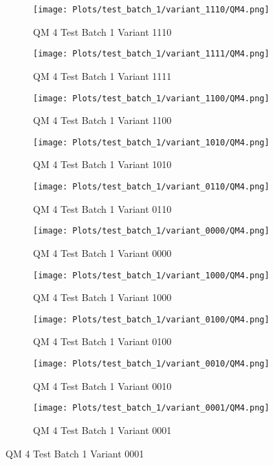 \documentclass{DissertateFigs}
\begin{document}
\begin{figure}[t!]
    \begin{subfigure}{0.47\textwidth}
    \texttt{[image: Plots/test\_batch\_1/variant\_1110/QM4.png]}
    \caption{QM 4 Test Batch 1 Variant 1110}
    \end{subfigure}
    \begin{subfigure}{0.47\textwidth}
    \texttt{[image: Plots/test\_batch\_1/variant\_1111/QM4.png]}
    \caption{QM 4 Test Batch 1 Variant 1111}
    \end{subfigure}

\medskip

    \begin{subfigure}{0.47\textwidth}
    \texttt{[image: Plots/test\_batch\_1/variant\_1100/QM4.png]}
    \caption{QM 4 Test Batch 1 Variant 1100}
    \end{subfigure}
    \begin{subfigure}{0.47\textwidth}
    \texttt{[image: Plots/test\_batch\_1/variant\_1010/QM4.png]}
    \caption{QM 4 Test Batch 1 Variant 1010}
    \end{subfigure}

\medskip

    \begin{subfigure}{0.47\textwidth}
    \texttt{[image: Plots/test\_batch\_1/variant\_0110/QM4.png]}
    \caption{QM 4 Test Batch 1 Variant 0110}
    \end{subfigure}
    \begin{subfigure}{0.47\textwidth}
    \texttt{[image: Plots/test\_batch\_1/variant\_0000/QM4.png]}
    \caption{QM 4 Test Batch 1 Variant 0000}
    \end{subfigure}

\medskip

    \begin{subfigure}{0.47\textwidth}
    \texttt{[image: Plots/test\_batch\_1/variant\_1000/QM4.png]}
    \caption{QM 4 Test Batch 1 Variant 1000}
    \end{subfigure}
    \begin{subfigure}{0.47\textwidth}
    \texttt{[image: Plots/test\_batch\_1/variant\_0100/QM4.png]}
    \caption{QM 4 Test Batch 1 Variant 0100}
    \end{subfigure}

\medskip

    \begin{subfigure}{0.47\textwidth}
    \texttt{[image: Plots/test\_batch\_1/variant\_0010/QM4.png]}
    \caption{QM 4 Test Batch 1 Variant 0010}
    \end{subfigure}
    \begin{subfigure}{0.47\textwidth}
    \texttt{[image: Plots/test\_batch\_1/variant\_0001/QM4.png]}
    \caption{QM 4 Test Batch 1 Variant 0001}
    \end{subfigure}


\end{figure}
\end{document}

